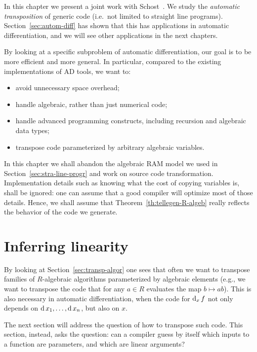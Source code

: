 

In this chapter we present a joint work with
Schost~\cite{df+schost10}. We study the
\emph{automatic transposition} of
generic code (i.e.\ not limited to straight line programs).
Section~\ref{sec:autom-diff} has shown that this has applications in
automatic differentiation, and we will see other applications in the
next chapters.

By looking at a specific subproblem of automatic differentiation, our
goal is to be more efficient and more general. In particular, compared
to the existing implementations of AD tools, we want to:
\begin{itemize}
\item avoid unnecessary space overhead;
\item handle algebraic, rather than just numerical code;
\item handle advanced programming constructs, including recursion and
  algebraic data types;
\item transpose code parameterized by arbitrary algebraic variables.
\end{itemize}

In this chapter we shall abandon the algebraic RAM model we used in
Section~\ref{sec:stra-line-progr} and work on source code
transformation. Implementation details such as knowing what the cost
of copying variables is, shall be ignored: one can assume that a good
compiler will optimize most of those details. Hence, we shall assume
that Theorem~\ref{th:tellegen-R-algeb} really reflects the behavior of
the code we generate.


\section{Inferring linearity}
\label{sec:inference}
\lstset{language=haskell}

By looking at Section~\ref{sec:transp-algor} one sees that often we
want to transpose families of $R$-algebraic algorithms parameterized
by algebraic elements (e.g., we want to transpose the code that for
any $a\in R$ evaluates the map $b\mapsto ab$). This is also necessary
in automatic differentiation, when the code for $\operatorname{d}_x f$ not only
depends on $\operatorname{d} x_1,\ldots,\operatorname{d} x_n$, but also on $x$.

The next section will address the question of how to transpose such
code. This section, instead, asks the question: can a compiler guess
by itself which inputs to a function are parameters, and which are
linear arguments?

